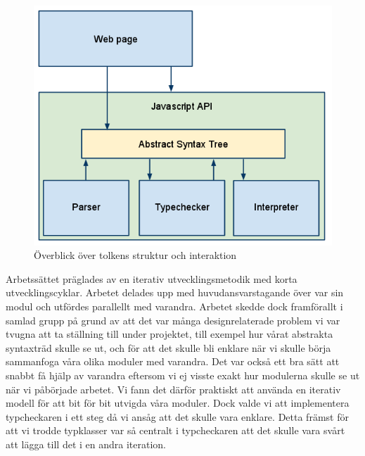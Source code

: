 \begin{figure}[h]
    \begin{center}
        \includegraphics[width=1.0\textwidth]{image1.png}
        \caption{Överblick över tolkens struktur och interaktion}
        \label{fig:tolkens_struktur} %
    \end{center}
\end{figure}

Arbetssättet präglades av en iterativ utvecklingsmetodik med korta utvecklingscyklar. Arbetet delades upp med huvudansvarstagande över var sin modul och utfördes parallellt med varandra. Arbetet skedde dock framförallt i samlad grupp på grund av att det var många designrelaterade problem vi var tvugna att ta ställning till under projektet, till exempel hur vårat abstrakta syntaxträd skulle se ut, och för att det skulle bli enklare när vi skulle börja sammanfoga våra olika moduler med varandra. 
Det var också ett bra sätt att snabbt få hjälp av varandra eftersom vi ej visste exakt hur modulerna skulle se ut när vi påbörjade arbetet. Vi fann det därför praktiskt att använda en iterativ modell för att bit för bit utvigda våra moduler. Dock valde vi att implementera typcheckaren i ett steg då vi ansåg att det skulle vara enklare. Detta främst för att vi trodde typklasser var så centralt i typcheckaren att det skulle vara svårt att lägga till det i en andra iteration. 

